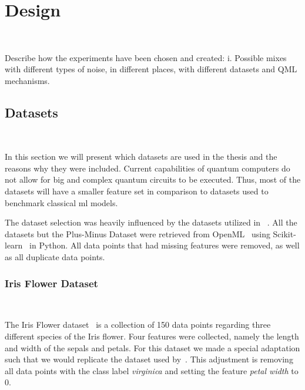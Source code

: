 \chapter{Design}\label{chapter:design} \

Describe how the experiments have been chosen and created:
  i.	Possible mixes with different types of noise, in different places, with different datasets and QML mechanisms.

\section{Datasets}\label{section:datasets} \

In this section we will present which datasets are used in the thesis
and the reasons why they were included. Current capabilities of
quantum computers do not allow for big and complex quantum circuits
to be executed. Thus, most of the datasets will have a smaller
feature set in comparison to datasets used to benchmark classical
\ac{ml} models. \

The dataset selection was heavily influenced by the datasets utilized in
~\cite{winderl_quantum_2023}. All the datasets but the Plus-Minus
Dataset were retrieved from OpenML~\cite{vanschoren_openml_2014} using
Scikit-learn~\cite{pedregosa_scikit-learn_2011} in Python. All data
points that had missing features were removed, as well as all duplicate
data points. \

\subsection{Iris Flower Dataset} \

The Iris Flower dataset~\cite{fisher_use_1936} is a collection of
150 data points regarding three different species of the Iris flower.
Four features were collected, namely the length and width of the sepals
and petals. For this dataset we made a special adaptation such that
we would replicate the dataset used by~\cite{du_quantum_2021}. This
adjustment is removing all data points with the class label
\textit{virginica} and setting the feature \textit{petal width}
to \(0\). \

